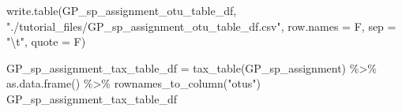 \documentclass[
]{article}
\newenvironment{Shaded}{\begin{snugshade}}{\end{snugshade}}
\newcommand{\AttributeTok}[1]{\textcolor[rgb]{0.77,0.63,0.00}{#1}}
\newcommand{\FunctionTok}[1]{\textcolor[rgb]{0.00,0.00,0.00}{#1}}
\newcommand{\NormalTok}[1]{#1}
\newcommand{\OtherTok}[1]{\textcolor[rgb]{0.56,0.35,0.01}{#1}}
\newcommand{\SpecialCharTok}[1]{\textcolor[rgb]{0.00,0.00,0.00}{#1}}
\newcommand{\StringTok}[1]{\textcolor[rgb]{0.31,0.60,0.02}{#1}}
\begin{document}
\begin{Shaded}
\begin{Highlighting}[]
\FunctionTok{write.table}\NormalTok{(GP\_sp\_assignment\_otu\_table\_df, }\StringTok{"./tutorial\_files/GP\_sp\_assignment\_otu\_table\_df.csv"}\NormalTok{,}
            \AttributeTok{row.names =}\NormalTok{ F,}
            \AttributeTok{sep =} \StringTok{"}\SpecialCharTok{\textbackslash{}t}\StringTok{"}\NormalTok{,}
            \AttributeTok{quote =}\NormalTok{ F)}
\end{Highlighting}
\end{Shaded}

\begin{Shaded}
\begin{Highlighting}[]
\NormalTok{GP\_sp\_assignment\_tax\_table\_df }\OtherTok{=} \FunctionTok{tax\_table}\NormalTok{(GP\_sp\_assignment) }\SpecialCharTok{\%\textgreater{}\%} 
  \FunctionTok{as.data.frame}\NormalTok{() }\SpecialCharTok{\%\textgreater{}\%} 
  \FunctionTok{rownames\_to\_column}\NormalTok{(}\StringTok{"otus"}\NormalTok{)}
\NormalTok{GP\_sp\_assignment\_tax\_table\_df}
\end{Highlighting}
\end{Shaded}
\end{document}
